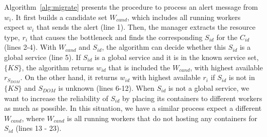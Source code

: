 Algorithm~\ref{alg:migrate} presents the procedure to process an alert message from $w_i$.
It first builds a candidate set $W_{cand}$, which includes all running workers expect $w_i$ that sends the alert (line 1).
Then, the manager extracts the resource type, $r_i$ that causes the bottleneck and finds the corresponding $S_{id}$ for the $C_{id}$ (lines 2-4).
With $W_{cand}$ and $S_{id}$, the algorithm can decide whether this $S_{id}$ is a global service (line 5).
If $S_{id}$ is a global service and it is in the known service set, $\{KS\}$, the algorithm returns $w_{id}$ that is included the $W_{cand}$, 
with highest available $r_{S_{DOM}}$.
On the other hand, it returns $w_{id}$ with highest available $r_i$ if $S_{id}$ is not in $\{KS\}$ and $S_{DOM}$ is unknown (lines 6-12).
When $S_{id}$ is not a global service, we want to increase the reliability of $S_{id}$ by placing its containers to different workers as much as possible.
In this situation, we have a similar process expect a different $W_{cand}$, where $W_{cand}$  is all running
workers that do not hosting any containers for $S_{id}$ (lines 13 - 23).



